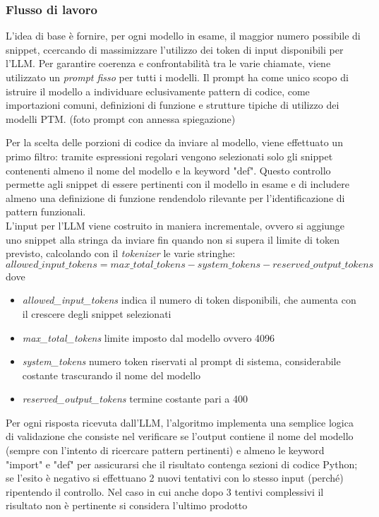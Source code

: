 \documentclass{article}
\begin{document}
\begin{itemize}
\subsubsection{Flusso di lavoro}
L'idea di base è fornire, per ogni modello in esame, il maggior numero possibile di snippet, ccercando di massimizzare l’utilizzo dei token di input disponibili per l’LLM. Per garantire coerenza e confrontabilità tra le varie chiamate, viene utilizzato un \textit{prompt fisso} per tutti i modelli. Il prompt ha come unico scopo di istruire il modello a individuare eclusivamente pattern di codice, come importazioni comuni, definizioni di funzione e strutture tipiche di utilizzo dei modelli PTM.
(foto prompt con annessa spiegazione)

Per la scelta delle porzioni di codice da inviare al modello, viene effettuato un primo filtro: tramite espressioni regolari vengono selezionati solo gli snippet contenenti almeno il nome del modello e la keyword "def". Questo controllo permette agli snippet di essere pertinenti con il modello in esame e di includere almeno una definizione di funzione rendendolo rilevante per l'identificazione di pattern funzionali.\\
L'input per l'LLM viene costruito in maniera incrementale, ovvero si aggiunge uno snippet alla stringa da inviare fin quando non si supera il limite di token previsto, calcolando con il \textit{tokenizer} le varie stringhe:
\[
allowed\_input\_tokens = max\_total\_tokens - system\_tokens - reserved\_output\_tokens
\]
dove
\begin{itemize}
    \item \textit{allowed\_input\_tokens} indica il numero di token disponibili, che aumenta con il crescere degli snippet selezionati
    \item \textit{max\_total\_tokens} limite imposto dal modello ovvero 4096
    \item \textit{system\_tokens} numero token riservati al prompt di sistema, considerabile costante trascurando il nome del modello
    \item \textit{reserved\_output\_tokens} termine costante pari a 400
\end{itemize}
Per ogni risposta ricevuta dall'LLM, l'algoritmo implementa una semplice logica di validazione che consiste nel verificare se l'output contiene il nome del modello (sempre con l'intento di ricercare pattern pertinenti) e almeno le keyword "import" e "def" per assicurarsi che il risultato contenga sezioni di codice Python; se l'esito è negativo si effettuano 2 nuovi tentativi con lo stesso input (perché) ripentendo il controllo. Nel caso in cui anche dopo 3 tentivi complessivi il risultato non è pertinente si considera l'ultimo prodotto  



\end{itemize}
\end{document}
